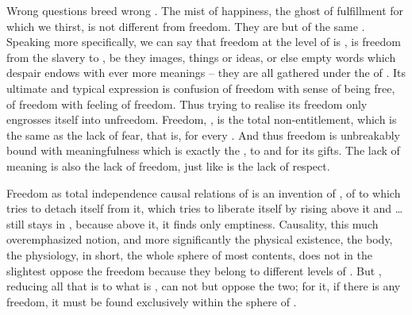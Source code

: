 Wrong questions breed wrong .  The mist of {happiness}, the
ghost of {fulfillment} for which we thirst, is not different from freedom. They
are but  of the same \nexus. Speaking more specifically, we can say
that freedom at the level of  is , is freedom
from the slavery to , be they images, things or ideas, or else empty
words which despair endows with ever more  meanings -- they are all
gathered under the  of . Its ultimate and typical
expression is confusion of freedom with  sense of being free, of freedom
with  feeling of freedom. Thus  trying to realise its
freedom only engrosses itself into unfreedom.  Freedom, , is
the total non-entitlement, which is the same as the lack of fear, that is,
 for every . And thus freedom is unbreakably bound with
meaningfulness which is exactly the ,  to
 and  for its gifts. The lack of meaning
is also the lack of freedom, just like is the lack of respect.



\pa \act %
Freedom as total independence  causal relations of
 is an invention of , of  to
 which tries to {detach} itself from it, which tries to
liberate itself by rising above it and \ldots still stays in ,
because above it, it finds only emptiness.  Causality, this much
overemphasized notion, and more significantly the physical existence, the
body, the physiology, in short, the whole sphere of most 
contents, does not in the slightest oppose the freedom because
they belong to different levels of . But ,
reducing all that is to what is , can not but oppose the two; for
it, if there is any freedom, it must be found exclusively within the sphere of
.

